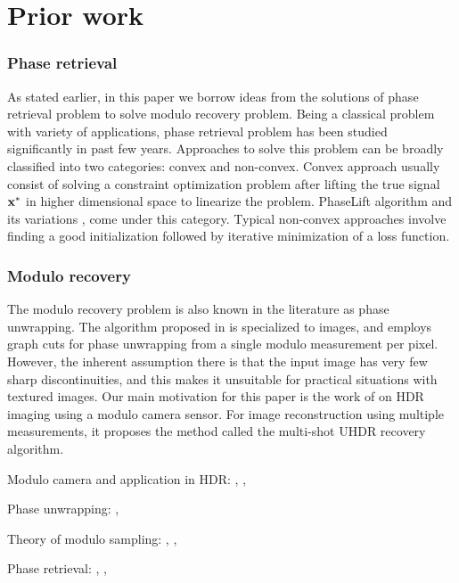 \section{Prior work}
\label{sec:prior}

\subsubsection*{Phase retrieval} As stated earlier, in this paper we borrow ideas from the solutions of phase retrieval problem to solve modulo recovery problem. Being a classical problem with variety of applications, phase retrieval problem has been studied significantly in past few years. Approaches to solve this problem can be broadly classified into two categories: convex and non-convex. 
Convex approach usually consist of solving a constraint optimization problem after lifting the true signal $\mathbf{x^*}$ in higher dimensional space to linearize the problem. PhaseLift algorithm \cite{candes2013phaselift} and its variations \cite{gross2017improved}, \cite{candes2015phase} come under this category. Typical non-convex approaches involve finding a good initialization followed by iterative minimization of a loss function.


\subsubsection*{Modulo recovery} The modulo recovery problem is also known in the literature
as phase unwrapping. The algorithm proposed in \cite{bioucas2007phase} is specialized to images, and employs graph cuts for phase unwrapping from a single modulo measurement per pixel. However, the inherent assumption there is that the input image has very few sharp discontinuities, and this makes it unsuitable for practical situations with textured images. Our main motivation for this paper is the work of \cite{ICCP15_Zhao} on HDR imaging using a modulo camera sensor. For image reconstruction using multiple measurements, it proposes the method called the multi-shot UHDR recovery algorithm.


Modulo camera and application in HDR: \cite{ICCP15_Zhao}, \cite{Shah}, \cite{Lang2017}

Phase unwrapping: \cite{bioucas2007phase}, \cite{Hooper2007}

Theory of modulo sampling: \cite{Bhandari}, \cite{Cucuringu2017}, \cite{Cucuringu2018}

Phase retrieval: \cite{Netrapalli2013}, \cite{Jagatap2017}, 


